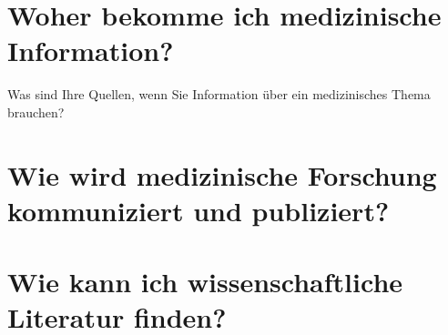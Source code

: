 \documentclass{beamer}
\begin{document}


\section{Woher bekomme ich medizinische Information? }

\begin{frame}{Was sind Ihre Quellen, wenn Sie Information über ein medizinisches Thema brauchen?}



\end{frame}

















\section{Wie wird medizinische Forschung kommuniziert und publiziert?}

\section{Wie kann ich wissenschaftliche Literatur finden?}
\end{document}
